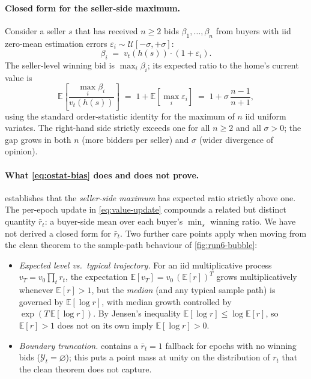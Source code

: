 \paragraph{Closed form for the seller-side maximum.}
Consider a seller $s$ that has received $n \ge 2$ bids
$\beta_{1}, \dots, \beta_{n}$ from buyers with iid zero-mean
estimation errors $\varepsilon_{i} \sim \mathcal{U}[-\sigma, +\sigma]$:
\begin{equation}
\label{eq:bid-decomp}
\beta_{i} \;=\; v_{t}(h(s)) \cdot (1 + \varepsilon_{i}).
\end{equation}
The seller-level winning bid is $\max_{i} \beta_{i}$; its expected
ratio to the home's current value is
\begin{equation}
\label{eq:ostat-bias}
\mathbb{E}\!\left[\frac{\max_{i}\beta_{i}}{v_{t}(h(s))}\right]
\;=\;
1 + \mathbb{E}\!\left[\max_{i}\varepsilon_{i}\right]
\;=\;
1 + \sigma\,\frac{n - 1}{n + 1},
\end{equation}
using the standard order-statistic identity for the maximum of $n$
iid uniform variates. The right-hand side strictly exceeds one for
all $n \ge 2$ and all $\sigma > 0$; the gap grows in both $n$
(more bidders per seller) and $\sigma$ (wider divergence of opinion).

\paragraph{What \cref{eq:ostat-bias} does and does not prove.}
 establishes that the \emph{seller-side
maximum} has expected ratio strictly above one. The per-epoch update
in \cref{eq:value-update} compounds a related but distinct quantity
$\bar{r}_{t}$: a buyer-side mean over each buyer's $\min_{s}$ winning
ratio. We have not derived a closed form for $\bar{r}_{t}$. Two
further care points apply when moving from the clean theorem to the
sample-path behaviour of \cref{fig:run6-bubble}:
\begin{itemize}[leftmargin=*,nosep]
\item \emph{Expected level vs.\ typical trajectory.} For an iid
      multiplicative process $v_{T} = v_{0}\prod_{t}r_{t}$, the
      expectation $\mathbb{E}[v_{T}] = v_{0}\,(\mathbb{E}[r])^{T}$
      grows multiplicatively whenever $\mathbb{E}[r]>1$, but the
      \emph{median} (and any typical sample path) is governed by
      $\mathbb{E}[\log r]$, with median growth controlled by
      $\exp(T\,\mathbb{E}[\log r])$. By Jensen's inequality
      $\mathbb{E}[\log r] \le \log \mathbb{E}[r]$, so
      $\mathbb{E}[r]>1$ does not on its own imply
      $\mathbb{E}[\log r]>0$.
\item \emph{Boundary truncation.}  contains a
      $\bar{r}_{t}=1$ fallback for epochs with no winning bids
      ($\mathcal{Y}_{t}=\varnothing$); this puts a point mass at
      unity on the distribution of $r_{t}$ that the clean
      theorem does not capture.
\end{itemize}

